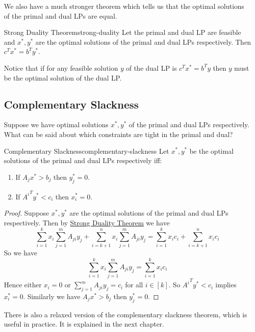 We also have a much stronger theorem which tells us that the optimal solutions of the primal and dual LPs are equal. 
\begin{Theorem}{Strong Duality Theorem}{strong-duality}
	Let the primal and dual LP are feasible and $x^*,y^*$ are the optimal solutions of the primal and dual LPs respectively. Then $c^Tx^*=b^Ty^*$.
\end{Theorem}
Notice that if for any feasible solution $y$ of the dual LP is $c^Tx^*=b^Ty$ then $y$ must be the optimal solution of the dual LP. 
\subsection{Complementary Slackness}
\begin{question}{}{}
	Suppose we have optimal solutions $x^*,y^*$ of the primal and dual LPs respectively. What can be said about which constraints are tight in the primal and dual?
\end{question}
\begin{Theorem}{Complementary Slackness}{complementary-slackness}
	Let $x^*,y^*$ be the optimal solutions of the primal and dual LPs respectively iff:
	\begin{enumerate}[label=(\roman*)]
		\item If $A_jx^*>b_j$ then $y_j^*=0$.
		\item If ${A^i}^Ty^*<c_i$ then $x_i^*=0$.
	\end{enumerate}
\end{Theorem}
\begin{proof}
	Suppose $x^*,y^*$ are the optimal solutions of the primal and dual LPs respectively. Then by \hyperref[th:strong-duality]{Strong Duality Theorem}  we have $$\sum\limits_{i=1}^k x_i\sum\limits_{j=1}^m A_{ji}y_j+\sum\limits_{i=k+1}^n x_i\sum\limits_{j=1}^m A_{ji}y_j=\sum\limits_{i=1}^k x_ic_i+\sum\limits_{i=k+1}^n x_ic_i$$So we have $$\sum\limits_{i=1}^k x_i\sum\limits_{j=1}^m A_{ji}y_j=\sum\limits_{i=1}^k x_ic_i$$Hence either $x_i=0$ or $\sum\limits_{j=1}^m A_{ji}y_j=c_i$ for all $i\in[k]$. So ${A^i}^Ty^*<c_i$ implies $x_i^*=0$. Similarly we have $A_jx^*>b_j$ then $y_j^*=0$.
\end{proof}

There is also a relaxed version of the complementary slackness theorem,  which is useful in practice. It is explained in the next chapter.
